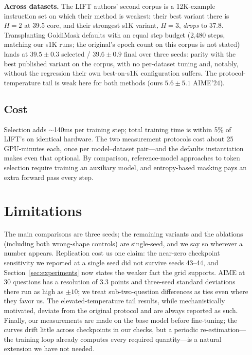 \documentclass{article} %
\begin{document}
\textbf{Across datasets.} The LIFT authors' second corpus is a 12K-example instruction set on which their method is weakest: their best variant there is $H{=}2$ at 39.5 core, and their strongest s1K variant, $H{=}3$, \emph{drops} to 37.8. Transplanting GoldiMask defaults with an equal step budget (2{,}480 steps, matching our s1K runs; the original's epoch count on this corpus is not stated) lands at $39.5 \pm 0.3$ selected / $39.6 \pm 0.9$ final over three seeds: parity with the best published variant on the corpus, with no per-dataset tuning and, notably, without the regression their own best-on-s1K configuration suffers. The protocol-temperature tail is weak here for both methods (ours $5.6 \pm 5.1$ AIME'24).

\subsection{Cost}

Selection adds $\sim$140ms per training step; total training time is within 5\% of LIFT's on identical hardware. The two measurement protocols cost about 25 GPU-minutes each, once per model--dataset pair---and the defaults instantiation makes even that optional. By comparison, reference-model approaches to token selection require training an auxiliary model, and entropy-based masking pays an extra forward pass every step.

\section{Limitations}

The main comparisons are three seeds; the remaining variants and the ablations (including both wrong-shape controls) are single-seed, and we say so wherever a number appears. Replication cost us one claim: the near-zero checkpoint sensitivity we reported at a single seed did not survive seeds 43--44, and Section~\ref{sec:experiments} now states the weaker fact the grid supports. AIME at 30 questions has a resolution of 3.3 points and three-seed standard deviations there run as high as $\pm 10$; we treat sub-two-question differences as ties even where they favor us. The elevated-temperature tail results, while mechanistically motivated, deviate from the original protocol and are always reported as such. Finally, our measurements are made on the base model before fine-tuning; the curves drift little across checkpoints in our checks, but a periodic re-estimation---the training loop already computes every required quantity---is a natural extension we have not needed.
\end{document}
